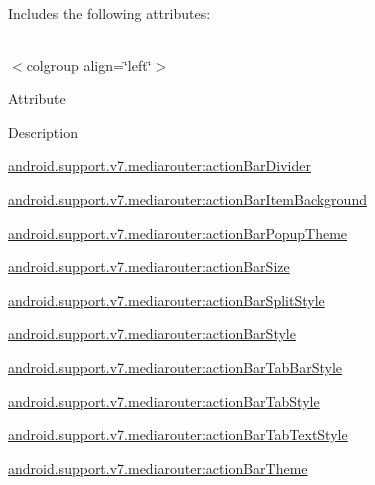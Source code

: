 Includes the following attributes\+:

\tabulinesep=1mm
\begin{longtabu} spread 0pt [c]{*{0}{|X[-1]}|}
\hline
\end{longtabu}
$<$colgroup align=\char`\"{}left\char`\"{}$>$ 

Attribute

Description 

{\ttfamily \hyperlink{classandroid_1_1support_1_1v7_1_1mediarouter_1_1R_1_1styleable_a6ca0030f0c9be330422f3f56c9118802}{android.\+support.\+v7.\+mediarouter\+:action\+Bar\+Divider}}

{\ttfamily \hyperlink{classandroid_1_1support_1_1v7_1_1mediarouter_1_1R_1_1styleable_a90c427e103e51830dfc3b0742ec37ff4}{android.\+support.\+v7.\+mediarouter\+:action\+Bar\+Item\+Background}}

{\ttfamily \hyperlink{classandroid_1_1support_1_1v7_1_1mediarouter_1_1R_1_1styleable_af1394a44da974408e6b670d517a5c780}{android.\+support.\+v7.\+mediarouter\+:action\+Bar\+Popup\+Theme}}

{\ttfamily \hyperlink{classandroid_1_1support_1_1v7_1_1mediarouter_1_1R_1_1styleable_a5c243aa267f830337d4803475264a5dc}{android.\+support.\+v7.\+mediarouter\+:action\+Bar\+Size}}

{\ttfamily \hyperlink{classandroid_1_1support_1_1v7_1_1mediarouter_1_1R_1_1styleable_a7a7aca24fc568f1643e2776667ac41ba}{android.\+support.\+v7.\+mediarouter\+:action\+Bar\+Split\+Style}}

{\ttfamily \hyperlink{classandroid_1_1support_1_1v7_1_1mediarouter_1_1R_1_1styleable_a24d210b595f7652ac59fe60ecb3e5550}{android.\+support.\+v7.\+mediarouter\+:action\+Bar\+Style}}

{\ttfamily \hyperlink{classandroid_1_1support_1_1v7_1_1mediarouter_1_1R_1_1styleable_af1dbff66a310e66d54936e5a64a53920}{android.\+support.\+v7.\+mediarouter\+:action\+Bar\+Tab\+Bar\+Style}}

{\ttfamily \hyperlink{classandroid_1_1support_1_1v7_1_1mediarouter_1_1R_1_1styleable_a05c688cad9d1778c9c006d3567c37651}{android.\+support.\+v7.\+mediarouter\+:action\+Bar\+Tab\+Style}}

{\ttfamily \hyperlink{classandroid_1_1support_1_1v7_1_1mediarouter_1_1R_1_1styleable_a943bcdaec9fb96bdbc26392220e88255}{android.\+support.\+v7.\+mediarouter\+:action\+Bar\+Tab\+Text\+Style}}

{\ttfamily \hyperlink{classandroid_1_1support_1_1v7_1_1mediarouter_1_1R_1_1styleable_a4e99b208f1389299006016c4c0a05bfc}{android.\+support.\+v7.\+mediarouter\+:action\+Bar\+Theme}}

